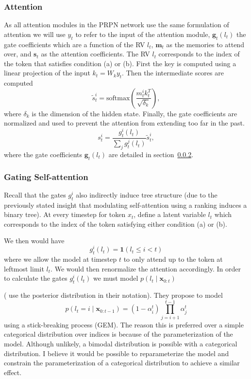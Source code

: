 \documentclass{article}
\newcommand{\bx}{\mathbf{x}}
\begin{document}
\subsubsection{Attention}
\label{subsec:attn}
As all attention modules in the PRPN network use the same formulation of attention we will use 
$y_t$ to refer to the input of the attention module,
$\bm{g}_t(l_t)$ the gate coefficients which are a function of the RV $l_t$,
$\bm{m}_t$ as the memories to attend over, and $\bm{s}_t$ as the attention coefficients.
The RV $l_t$ corresponds to the index of the token that satisfies condition (a) or (b).
First the key is computed using a linear projection of the input $k_t = W_ky_t$.
Then the intermediate scores are computed
$$\tilde{s}^i_t = \textrm{softmax}\left(\frac{m^i_tk^T_t}{\sqrt{\delta_k}}\right),$$
where $\delta_k$ is the dimension of the hidden state.
Finally, the gate coefficients are normalized and used to prevent the attention from
extending too far in the past.
$$s^i_t = \frac{g^i_t(l_t)}{\sum_jg^j_t(l_t)}\tilde{s}^i_t,$$
where the gate coefficients $\bm{g}_t(l_t)$ are detailed in section~\ref{subsec:gates}.

\subsubsection{Gating Self-attention}
\label{subsec:gates}
Recall that the gates $g^i_t$ also indirectly induce tree structure
(due to the previously stated insight that modulating self-attention
using a ranking induces a binary tree).
At every timestep for token $x_t$,
\citet{shen2018prpn} define a latent variable $l_t$ which corresponds to the index of the 
token satisfying either condition (a) or (b).

We then would have $$g^i_t(l_t) = \mathbf{1}(l_t \le i < t)$$
where we allow the model at timestep $t$ to only attend up to the token at leftmost limit $l_t$.
We would then renormalize the attention accordingly.
In order to calculate the gates $g^i_t(l_t)$ we must model $p(l_t\mid\bx_{0:t})$ 

(\citet{shen2018prpn} use the posterior distribution in their notation).
They propose to model 
$$p(l_t=i\mid\bx_{0:t-1})=(1-\alpha_i^t)\prod_{j=i+1}^{t-1}\alpha_j^t$$
using a stick-breaking process (GEM).
The reason this is preferred over a simple categorical distribution over indices is because
of the parameterization of the model.
Although unlikely, a bimodal distribution is possible with a categorical distribution.
I believe it would be possible to reparameterize the model and constrain the parameterization of a 
categorical distribution to achieve a similar effect.
\end{document}
